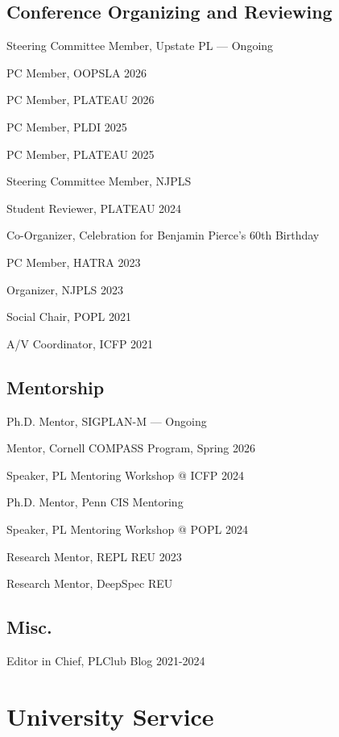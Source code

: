 \documentclass[a4paper]{article}
\begin{document}
\subsection*{Conference Organizing and Reviewing}

\noindent Steering Committee Member, Upstate PL — Ongoing

\bigskip
\noindent PC Member, OOPSLA 2026

\bigskip
\noindent PC Member, PLATEAU 2026

\bigskip
\noindent PC Member, PLDI 2025

\bigskip
\noindent PC Member, PLATEAU 2025

\bigskip
\noindent Steering Committee Member, NJPLS

\bigskip
\noindent Student Reviewer, PLATEAU 2024

\bigskip
\noindent Co-Organizer, Celebration for Benjamin Pierce’s 60th Birthday

\bigskip
\noindent PC Member, HATRA 2023

\bigskip
\noindent Organizer, NJPLS 2023

\bigskip
\noindent Social Chair, POPL 2021

\bigskip
\noindent A/V Coordinator, ICFP 2021

\subsection*{Mentorship}

\noindent Ph.D. Mentor, SIGPLAN-M --- Ongoing

\bigskip
\noindent Mentor, Cornell COMPASS Program, Spring 2026

\bigskip
\noindent Speaker, PL Mentoring Workshop @ ICFP 2024

\bigskip
\noindent Ph.D. Mentor, Penn CIS Mentoring

\bigskip
\noindent Speaker, PL Mentoring Workshop @ POPL 2024

\bigskip
\noindent Research Mentor, REPL REU 2023

\bigskip
\noindent Research Mentor, DeepSpec REU

\subsection*{Misc.}

\noindent Editor in Chief, PLClub Blog 2021-2024

\section*{University Service}
\end{document}
